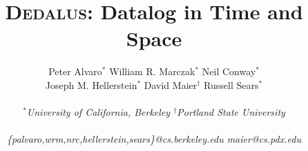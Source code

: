 \documentclass{sig-alternate}
\def\lang{\textsc{Dedalus}\xspace}
\begin{document}
\title{{\huge{\bf\lang}}:
Datalog in Time and Space} 
%


\author{
%
Peter Alvaro$^\ast$ \quad William R. Marczak$^\ast$ \quad Neil
Conway$^\ast$  \\
Joseph M. Hellerstein$^\ast$ \quad 
David Maier$^\dagger$ \quad Russell Sears$^\ast$ 
\\\\
%
\fontsize{10}{10}\selectfont\itshape 
$^\ast$University of California, Berkeley \quad $^\dagger$Portland State
University\\\\ \fontsize{9}{9}\selectfont\ttfamily\upshape
%
\{palvaro,wrm,nrc,hellerstein,sears\}@cs.berkeley.edu \quad maier@cs.pdx.edu
%
}

\toappear{}

\maketitle
\end{document}
